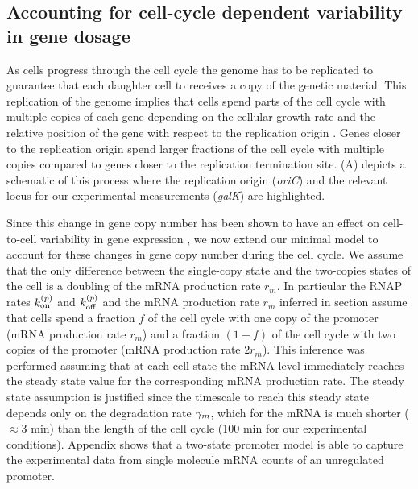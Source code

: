 \subsection{Accounting for cell-cycle dependent variability in gene dosage}

As cells progress through the cell cycle the genome has to be replicated to
guarantee that each daughter cell to receives a copy of the genetic material.
This replication of the genome implies that cells spend parts of the cell cycle
with multiple copies of each gene depending on the cellular growth rate and the
relative position of the gene with respect to the replication origin
\cite{Bremer1996}. Genes closer to the replication origin spend larger fractions
of the cell cycle with multiple copies compared to genes closer to the
replication termination site. (A) depicts a schematic of
this process where the replication origin ({\it oriC}) and the relevant locus
for our experimental measurements ({\it galK}) are highlighted.

Since this change in gene copy number has been shown to have an effect on
cell-to-cell variability in gene expression \cite{Jones2014a, Peterson2015}, we
now extend our minimal model to account for these changes in gene copy number
during the cell cycle.  We assume that the only difference between the
single-copy state and the two-copies states of the cell is a doubling of the
mRNA production rate $r_m$. In particular the RNAP rates $k^{(p)}_{\text{on}}$ and $k^{(p)}_{\text{off}}$
and the mRNA production rate $r_m$ inferred in section 
assume that cells spend a fraction $f$ of the cell cycle  with one copy of the
promoter (mRNA production rate $r_m$) and a fraction $(1-f)$ of the cell cycle
with two copies of the promoter (mRNA production rate $2 r_m$). This inference
was performed assuming that at each cell state the mRNA level immediately
reaches the steady state value for the corresponding mRNA production rate. The
steady state assumption is justified since the timescale to reach this steady
state depends only on the degradation rate $\gamma _m$, which for the mRNA  is much
shorter ($\approx 3$ min) than the length of the cell cycle (100 min for our
experimental conditions). Appendix 
shows that  a two-state promoter model is able to capture the experimental data
from single molecule mRNA counts of an unregulated promoter.

